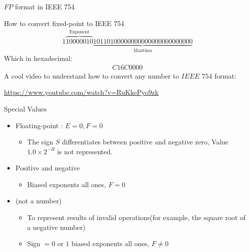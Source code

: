 \begin{parag}{$FP$ format in IEEE 754}
\begin{subparag}{How to convert fixed-point to IEEE 754}
        \begin{align*}
        1\overbrace{10000010}^{ \text{Exponent}} \underbrace{10110100000000000000000000000}_{ \text{Mantissa}}
        \end{align*}
        Which in hexadecimal:
        \begin{align*}
            C16C0000
        \end{align*}
        A cool video to understand how to convert any number to $IEEE$ $754$ format:
        \begin{center}
            \url{https://www.youtube.com/watch?v=RuKkePyo9zk}
        \end{center}
        
        
        
        
        

        
    \end{subparag}
        \end{parag}
        
        \begin{parag}{Special Values}
            \begin{itemize}
                \item Floating-point : $E = 0, F = 0$
                    \begin{itemize}
                        \item The sign $S$ differentiates between positive and negative zero, Value $1.0 \times 2^{-B}$ is not represented.
                    \end{itemize}
                \item Positive and negative 
                    \begin{itemize}
                        \item Biased exponents all ones, $F = 0$
                       
                    \end{itemize}
                \item {} (not a number)
                    \begin{itemize}
                        \item To represent results of invalid operations(for example, the square root of a negative number)
                        \item Sign $= 0$ or $1$ biased exponents all ones, $F \neq 0$
                    \end{itemize}
            \end{itemize}
        \end{parag}
        
